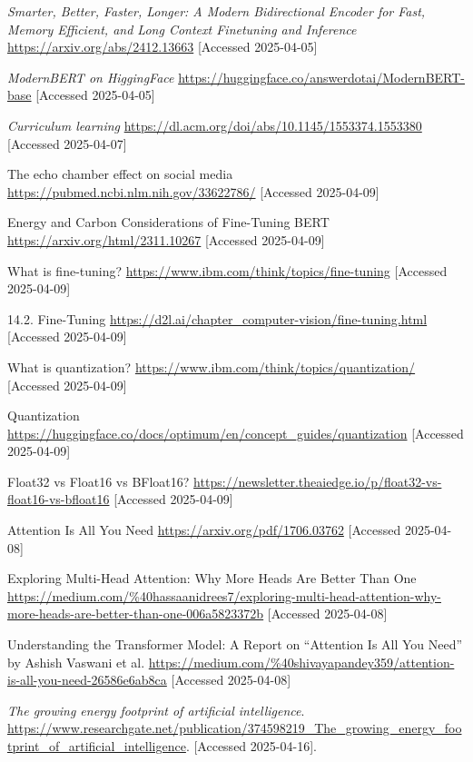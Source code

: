 \documentclass[licencjacka,en]{pracamgr}
\begin{document}
\begin{thebibliography}{99}
    \textit{Smarter, Better, Faster, Longer: A Modern Bidirectional Encoder for Fast, Memory Efficient, and Long Context Finetuning and Inference}
    \url{https://arxiv.org/abs/2412.13663}
    [Accessed 2025-04-05]

    \textit{ModernBERT on HiggingFace}
    \url{https://huggingface.co/answerdotai/ModernBERT-base}
    [Accessed 2025-04-05]

    \textit{Curriculum learning}
    \url{https://dl.acm.org/doi/abs/10.1145/1553374.1553380}
    [Accessed 2025-04-07]

    The echo chamber effect on social media
    \url{https://pubmed.ncbi.nlm.nih.gov/33622786/}
    [Accessed 2025-04-09]

    Energy and Carbon Considerations of Fine-Tuning BERT
    \url{https://arxiv.org/html/2311.10267}
    [Accessed 2025-04-09]

    What is fine-tuning?
    \url{https://www.ibm.com/think/topics/fine-tuning}
    [Accessed 2025-04-09]

    14.2. Fine-Tuning
    \url{https://d2l.ai/chapter_computer-vision/fine-tuning.html}
    [Accessed 2025-04-09]

    What is quantization?
    \url{https://www.ibm.com/think/topics/quantization/}
    [Accessed 2025-04-09]

    Quantization
    \url{https://huggingface.co/docs/optimum/en/concept_guides/quantization}
    [Accessed 2025-04-09]

    Float32 vs Float16 vs BFloat16?
    \url{https://newsletter.theaiedge.io/p/float32-vs-float16-vs-bfloat16}
    [Accessed 2025-04-09]

    Attention Is All You Need
    \url{https://arxiv.org/pdf/1706.03762}
    [Accessed 2025-04-08]

    Exploring Multi-Head Attention: Why More Heads Are Better Than One
    \url{https://medium.com/%40hassaanidrees7/exploring-multi-head-attention-why-more-heads-are-better-than-one-006a5823372b}
    [Accessed 2025-04-08]

    Understanding the Transformer Model: A Report on “Attention Is All You Need” by Ashish Vaswani et al.
    \url{https://medium.com/%40shivayapandey359/attention-is-all-you-need-26586e6ab8ca}
    [Accessed 2025-04-08]

    \textit{The growing energy footprint of artificial intelligence}.
    \url{https://www.researchgate.net/publication/374598219_The_growing_energy_footprint_of_artificial_intelligence}.
    [Accessed 2025-04-16].

    
    \end{thebibliography}
    
\end{document}
